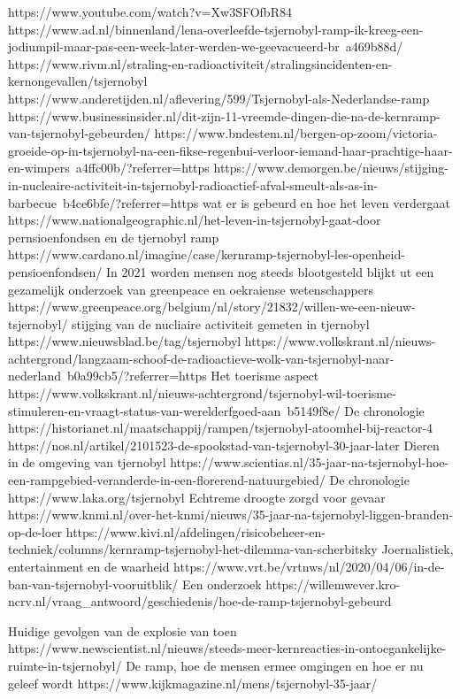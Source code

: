 https://www.youtube.com/watch?v=Xw3SFOfbR84
https://www.ad.nl/binnenland/lena-overleefde-tsjernobyl-ramp-ik-kreeg-een-jodiumpil-maar-pas-een-week-later-werden-we-geevacueerd-br~a469b88d/
https://www.rivm.nl/straling-en-radioactiviteit/stralingsincidenten-en-kernongevallen/tsjernobyl
https://www.anderetijden.nl/aflevering/599/Tsjernobyl-als-Nederlandse-ramp
https://www.businessinsider.nl/dit-zijn-11-vreemde-dingen-die-na-de-kernramp-van-tsjernobyl-gebeurden/
https://www.bndestem.nl/bergen-op-zoom/victoria-groeide-op-in-tsjernobyl-na-een-fikse-regenbui-verloor-iemand-haar-prachtige-haar-en-wimpers~a4ffc00b/?referrer=https%
https://www.demorgen.be/nieuws/stijging-in-nucleaire-activiteit-in-tsjernobyl-radioactief-afval-smeult-als-as-in-barbecue~b4ce6bfe/?referrer=https%
wat er is gebeurd en hoe het leven verdergaat
https://www.nationalgeographic.nl/het-leven-in-tsjernobyl-gaat-door
pernsioenfondsen en de tjernobyl ramp
https://www.cardano.nl/imagine/case/kernramp-tsjernobyl-les-openheid-pensioenfondsen/
In 2021 worden mensen nog steeds blootgesteld blijkt ut een gezamelijk onderzoek van greenpeace en oekraiense wetenschappers
https://www.greenpeace.org/belgium/nl/story/21832/willen-we-een-nieuw-tsjernobyl/
stijging van de nucliaire activiteit gemeten in tjernobyl
https://www.nieuwsblad.be/tag/tsjernobyl
https://www.volkskrant.nl/nieuws-achtergrond/langzaam-schoof-de-radioactieve-wolk-van-tsjernobyl-naar-nederland~b0a99cb5/?referrer=https%
Het toerisme  aspect
https://www.volkskrant.nl/nieuws-achtergrond/tsjernobyl-wil-toerisme-stimuleren-en-vraagt-status-van-werelderfgoed-aan~b5149f8e/
De chronologie
https://historianet.nl/maatschappij/rampen/tsjernobyl-atoomhel-bij-reactor-4
https://nos.nl/artikel/2101523-de-spookstad-van-tsjernobyl-30-jaar-later
Dieren in de omgeving van tjernobyl
https://www.scientias.nl/35-jaar-na-tsjernobyl-hoe-een-rampgebied-veranderde-in-een-florerend-natuurgebied/
De chronologie
https://www.laka.org/tsjernobyl
Echtreme droogte zorgd voor gevaar
https://www.knmi.nl/over-het-knmi/nieuws/35-jaar-na-tsjernobyl-liggen-branden-op-de-loer
https://www.kivi.nl/afdelingen/risicobeheer-en-techniek/columns/kernramp-tsjernobyl-het-dilemma-van-scherbitsky
Joernalistiek, entertainment en de waarheid
https://www.vrt.be/vrtnws/nl/2020/04/06/in-de-ban-van-tsjernobyl-vooruitblik/
Een onderzoek
https://willemwever.kro-ncrv.nl/vraag_antwoord/geschiedenis/hoe-de-ramp-tsjernobyl-gebeurd

Huidige gevolgen van de explosie van toen
https://www.newscientist.nl/nieuws/steeds-meer-kernreacties-in-ontoegankelijke-ruimte-in-tsjernobyl/
De ramp, hoe de mensen ermee omgingen en hoe er nu geleef wordt
https://www.kijkmagazine.nl/mens/tsjernobyl-35-jaar/

